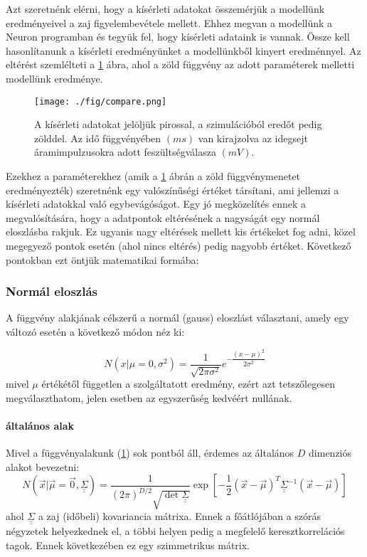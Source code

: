 Azt szeretnénk elérni, hogy a kísérleti adatokat összemérjük a modellünk eredményeivel a zaj figyelembevétele mellett. Ehhez megvan a modellünk a Neuron programban és tegyük fel, hogy kísérleti adataink is vannak. Össze kell hasonlítanunk a kísérleti eredményünket a modellünkből kinyert eredménnyel. Az eltérést szemlélteti a \ref{fig:compare} ábra, ahol a zöld függvény az adott paraméterek melletti modellünk eredménye.
\begin{figure}[!htb]
	\centering
	\texttt{[image: ./fig/compare.png]}
	\caption[Kísérletből és szimulációvól származó adatok]{A kísérleti adatokat jelöljük pirossal, a szimulációból eredőt pedig zölddel. Az idő függvényében $(ms)$ van kirajzolva az idegsejt áramimpulzusokra adott feszültségválasza $(mV)$.}
	\label{fig:compare}
\end{figure}
Ezekhez a paraméterekhez (amik a \ref{fig:compare} ábrán a zöld függvénymenetet eredményezték) szeretnénk egy valószínűségi értéket társítani, ami jellemzi a kísérleti adatokkal való egybevágóságot. Egy jó megközelítés ennek a megvalósítására, hogy a adatpontok eltérésének a nagyságát egy normál eloszlásba rakjuk. Ez ugyanis nagy eltérések mellett kis értékeket fog adni, közel megegyező pontok esetén (ahol nincs eltérés) pedig nagyobb értéket. Következő pontokban ezt öntjük matematikai formába:


\subsubsection{Normál eloszlás}
A függvény alakjának célszerű a normál (gauss) eloszlást választani, amely egy változó esetén a következő módon néz ki:

\begin{equation}\label{eq:gauss}
	N\left(x|\mu=0, \sigma^2\right) = \dfrac{1}{\sqrt{2\pi \sigma^2}}e^{-\dfrac{\left(x-\mu\right)^2}{2\sigma^2}}
\end{equation}
mivel $\mu$ értékétől független a szolgáltatott eredmény, ezért azt tetszőlegesen megválaszthatom, jelen esetben az egyszerűség kedvéért nullának. 

\paragraph{általános alak}
Mivel a függvényalakunk (\ref{fig:compare}) sok pontból áll, érdemes az általános $D$ dimenziós alakot bevezetni:
\begin{equation}\label{eq:gaussD}
	N\left(\vec{x}|\vec{\mu}=\vec{0}, \underline{\underline{ \Sigma }}\right) = \dfrac{1}{\left(2\pi\right)^{D/2} \sqrt{\det \underline{\underline{ \Sigma }}}}\exp\left[-\dfrac{1}{2}\left(\vec{x}-\vec{\mu}\right)^T \underline{\underline{ \Sigma }}^{-1}\left(\vec{x}-\vec{\mu}\right)\right]
\end{equation}
ahol $\underline{\underline{ \Sigma }}$ a zaj (időbeli) kovariancia mátrixa. Ennek a főátlójában a szórás négyzetek helyezkednek el, a többi helyen pedig a megfelelő keresztkorrelációs tagok. Ennek következében ez egy szimmetrikus mátrix. 


